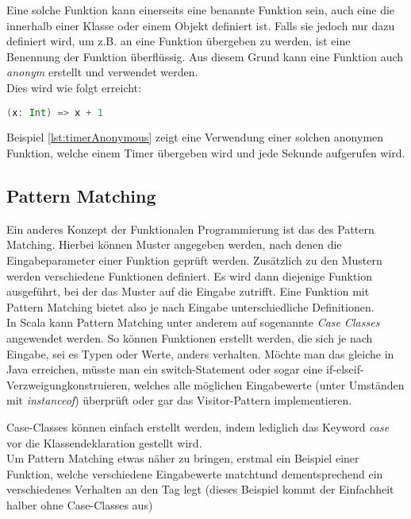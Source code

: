 Eine solche Funktion kann einerseits eine benannte Funktion sein, auch
eine die innerhalb einer Klasse oder einem Objekt definiert ist.  Falls
sie jedoch nur dazu definiert wird, um z.B. an eine Funktion übergeben
zu werden, ist eine Benennung der Funktion überflüssig. Aus diesem Grund
kann eine Funktion auch \emph{anonym} erstellt und verwendet werden.\\

Dies wird wie folgt erreicht: 

\begin{lstlisting}[float=ht,language=scala,caption=Anonyme Funktion,label=lst:anonymousFunction]
(x: Int) => x + 1
\end{lstlisting}

Beispiel \ref{lst:timerAnonymous} zeigt eine Verwendung einer solchen 
anonymen Funktion, welche einem Timer übergeben wird und jede Sekunde
aufgerufen wird. \\

\subsection{Pattern Matching}
\label{sec:patternMatching}

Ein anderes Konzept der Funktionalen Programmierung ist das des Pattern
Matching. Hierbei können Muster angegeben werden, nach denen die
Eingabeparameter einer Funktion geprüft werden. Zusätzlich zu den
Mustern werden verschiedene Funktionen definiert. Es wird dann diejenige
Funktion ausgeführt, bei der das Muster auf die Eingabe zutrifft. Eine
Funktion mit Pattern Matching bietet also je nach Eingabe unterschiedliche
Definitionen. \\

In Scala kann Pattern Matching unter anderem auf sogenannte \emph{Case
Classes} angewendet werden. So können Funktionen erstellt werden, die
sich je nach Eingabe, sei es Typen oder Werte, anders verhalten.  Möchte
man das gleiche in Java erreichen, müsste man ein switch-Statement
oder sogar eine \glqq if-elseif-Verzweigung\grqq konstruieren, welches
alle möglichen Eingabewerte (unter Umständen mit \emph{instanceof})
überprüft oder gar das Visitor-Pattern implementieren.

Case-Classes können einfach erstellt werden, indem lediglich das Keyword
\emph{case} vor die Klassendeklaration gestellt wird. \\

Um Pattern Matching etwas näher zu bringen, erstmal ein Beispiel einer
Funktion, welche verschiedene Eingabewerte \glqq matcht\grqq und dementsprechend
ein verschiedenes Verhalten an den Tag legt (dieses Beispiel kommt der 
Einfachheit halber ohne Case-Classes aus)


